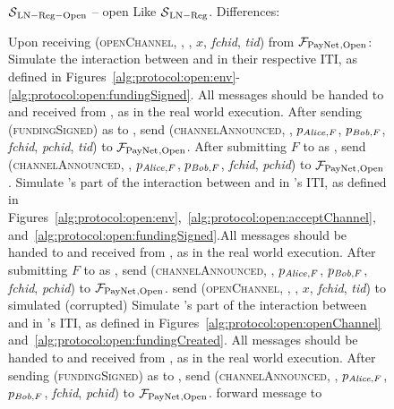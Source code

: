 \begin{figure}[!htbp]
  \begin{simulatorbox}{$\mathcal{S}{}_{\mathrm{LN - Reg - Open}}$ --
  open}
    Like $\mathcal{S}{}_{\mathrm{LN - Reg}}$. Differences:
    \begin{algorithmic}[1]
      \State Upon receiving (\textsc{openChannel}, \alice, \bob, $x$,
      \textit{fchid}, \textit{tid}) from $\mathcal{F}_{\mathrm{PayNet}}{}_{\mathrm{, Open}}$:
      \Indent
          \State Simulate the interaction between \alice{} and \bob{} in their
          respective ITI, as defined in
          Figures~\ref{alg:protocol:open:env}-\ref{alg:protocol:open:fundingSigned}.
          All messages should be handed to and received from \adversary, as in
          the real world execution.
          \State After sending (\textsc{fundingSigned}) as \bob{} to \alice,
          send (\textsc{channelAnnounced}, \bob, $p_{\mathit{Alice}, F}$, $p_{\mathit{Bob}, F}$,
          \textit{fchid}, \textit{pchid}, \textit{tid}) to
          $\mathcal{F}_{\mathrm{PayNet}}{}_{\mathrm{, Open}}$.
          \label{alg:sim:open:announced:bob:bothhonest}
          \State After submitting $F$ to \ledger{} as \alice, send
          (\textsc{channelAnnounced}, \alice, $p_{\mathit{Alice}, F}$, $p_{\mathit{Bob}, F}$,
          \textit{fchid}, \textit{pchid}) to $\mathcal{F}_{\mathrm{PayNet}}{}_{\mathrm{, Open}}$.
          \label{alg:sim:open:announced:alice:bothhonest}
          \State Simulate \alice's part of the interaction between \alice{}
          and \bob{} in \alice's ITI, as defined in
          Figures~\ref{alg:protocol:open:env},~\ref{alg:protocol:open:acceptChannel},
          and~\ref{alg:protocol:open:fundingSigned}.All messages should be
          handed to and received from \adversary, as in the real world
          execution.
          \State After submitting $F$ to \ledger{} as \alice, send
          (\textsc{channelAnnounced}, \alice, $p_{\mathit{Alice}, F}$, $p_{\mathit{Bob}, F}$,
          \textit{fchid}, \textit{pchid}) to $\mathcal{F}_{\mathrm{PayNet}}{}_{\mathrm{, Open}}$.
          \label{alg:sim:open:announced:alice:alicehonest}
          \State send (\textsc{openChannel}, \alice, \bob, $x$,
          \textit{fchid}, \textit{tid}) to simulated (corrupted) \alice
          \State Simulate \bob's part of the interaction between \alice{}
          and \bob{} in \bob's ITI, as defined in
          Figures~\ref{alg:protocol:open:openChannel}
          and~\ref{alg:protocol:open:fundingCreated}.
          All messages should be handed to and received from \adversary, as in
          the real world execution.
          \State After sending (\textsc{fundingSigned}) as \bob{} to \alice,
          send (\textsc{channelAnnounced}, \bob, $p_{\mathit{Alice}, F}$, $p_{\mathit{Bob}, F}$,
          \textit{fchid}, \textit{pchid}) to $\mathcal{F}_{\mathrm{PayNet}}{}_{\mathrm{, Open}}$.
          \label{alg:sim:open:announced:bob:bobhonest}
          \State forward message to \adversary{} 
        \EndIf
      \EndIndent
      \Statex


\end{algorithmic}
\end{simulatorbox}
\end{figure}
